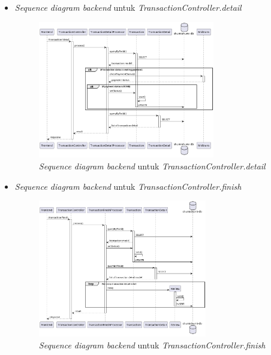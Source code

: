 \documentclass[a4paper]{article}
\begin{document}
\begin{enumerate}
\begin{enumerate}
\begin{itemize}
            \newpage
            \item \textit{Sequence diagram backend} untuk \textit{TransactionController.detail}
            \begin{figure}[h]
                \centering
                \includegraphics*[height=6cm]{diagram/sequence diagram/BE/transaction controller/detail/detail.png}
                \caption{\textit{Sequence diagram backend} untuk \textit{TransactionController.detail}}
            \end{figure}

            \item \textit{Sequence diagram backend} untuk \textit{TransactionController.finish}
            \begin{figure}[h]
                \centering
                \includegraphics*[height=6cm]{diagram/sequence diagram/BE/transaction controller/finish/finish.png}
                \caption{\textit{Sequence diagram backend} untuk \textit{TransactionController.finish}}
            \end{figure}


\end{itemize}
\end{enumerate}
\end{enumerate}
\end{document}
